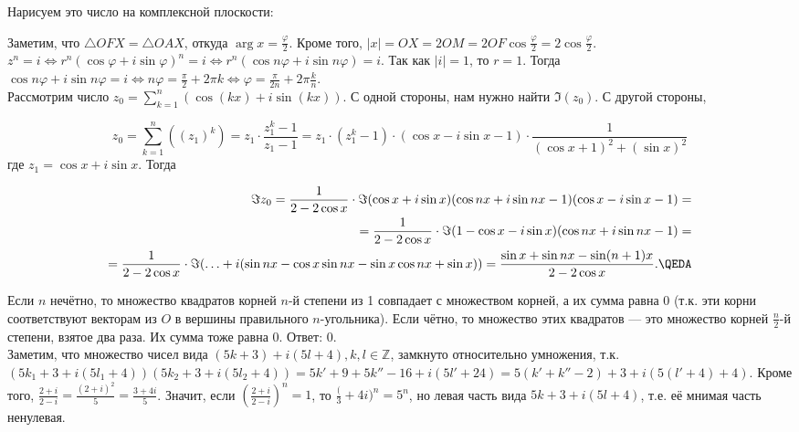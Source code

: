 \documentclass[12pt,a4paper]{article}
\begin{document}

\z Нарисуем это число на комплексной плоскости:


Заметим, что $\triangle OFX=\triangle OAX$, откуда $\arg x=\frac{\varphi}{2}$. Кроме того, $|x|=OX=2OM=2OF\cos \frac{\varphi}{2}=2\cos \frac{\varphi}{2}$.\QEDA\\

\z $z^n=i\iff r^n(\cos\varphi+i\sin\varphi)^n=i\iff r^n(\cos n\varphi+i\sin n\varphi)=i$. Так как $|i|=1$, то $r=1$. Тогда $\cos n\varphi+i\sin n\varphi=i\iff n\varphi=\frac{\pi}{2}+2\pi k\iff \varphi=\frac{\pi}{2n}+2\pi \frac{k}{n}$.\QEDA\\

\z Рассмотрим число $z_0=\sum_{k=1}^n(\cos(kx)+i\sin(kx))$. С одной стороны, нам нужно найти $\Im(z_0)$. С другой стороны,

\begin{equation*}
	z_0=\sum_{k=1}^n((z_1)^k)=z_1\cdot \frac{z_1^k-1}{z_1-1}=z_1\cdot (z_1^k-1)\cdot (\cos x-i\sin x-1)\cdot \frac1{(\cos x+1)^2+(\sin x)^2}
\end{equation*}
где $z_1=\cos x+i\sin x$. Тогда

\begin{align*}
	\Im z_0=\frac{1}{2-2\cos x}\cdot \Im(\cos x+i\sin x)(\cos nx+i\sin nx-1)(\cos x-i\sin x-1)=\\
	=\frac{1}{2-2\cos x}\cdot\Im (1-\cos x-i\sin x)(\cos nx+i\sin nx-1)=\\
	=\frac{1}{2-2\cos x}\cdot\Im(\ldots +i(\sin nx-\cos x\sin nx-\sin x\cos nx+\sin x))=\frac{\sin x+\sin nx-\sin(n+1)x}{2-2\cos x}.\QEDA
\end{align*}

\z Если $n$ нечётно, то множество квадратов корней $n$-й степени из 1 совпадает с множеством корней, а их сумма равна 0 (т.к. эти корни соответствуют векторам из $O$ в вершины правильного $n$-угольника). Если чётно, то множество этих квадратов --- это множество корней $\frac{n}{2}$-й степени, взятое два раза. Их сумма тоже равна 0. Ответ: 0.\QEDA\\

\z Заметим, что множество чисел вида $(5k+3)+i(5l+4),k,l\in \mathbb Z$, замкнуто относительно умножения, т.к. $(5k_1+3+i(5l_1+4))(5k_2+3+i(5l_2+4))=5k'+9+5k''-16+i(5l'+24)=5(k'+k''-2)+3+i(5(l'+4)+4)$. Кроме того, $\frac{2+i}{2-i}=\frac{(2+i)^2}{5}=\frac{3+4i}{5}$. Значит, если $(\frac{2+i}{2-i})^n=1$, то $\frac(3+4i)^n=5^n$, но левая часть вида $5k+3+i(5l+4)$, т.е. её мнимая часть ненулевая.\QEDA\\
\end{document}
